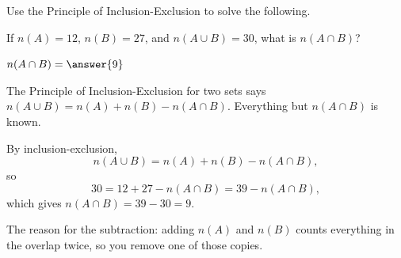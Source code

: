 \documentclass[12pt]{ximera}
\begin{document}
\begin{problem}
Use the Principle of Inclusion-Exclusion to solve the following.

If $n(A)=12$, $n(B)=27$, and $n(A\cup B)=30$, what is $n(A\cap B)$?

$n(A\cap B) = \answer{9}$

\begin{hint}
The Principle of Inclusion-Exclusion for two sets says
$n(A\cup B)=n(A)+n(B)-n(A\cap B)$. Everything but $n(A\cap B)$ is known.
\end{hint}

\begin{feedback}
By inclusion-exclusion,
\[ n(A\cup B) = n(A)+n(B)-n(A\cap B), \]
so
\[ 30 = 12+27-n(A\cap B) = 39 - n(A\cap B), \]
which gives $n(A\cap B)=39-30=9$.

The reason for the subtraction: adding $n(A)$ and $n(B)$ counts everything in the
overlap twice, so you remove one of those copies.
\end{feedback}
\end{problem}
\end{document}
